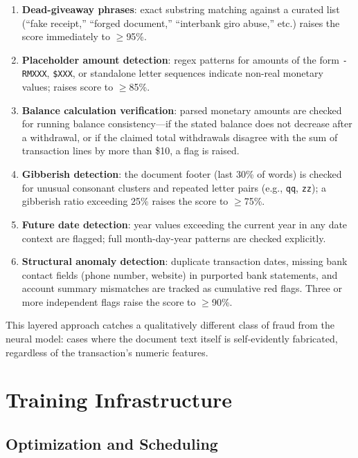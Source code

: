 \documentclass[10pt,conference,letterpaper]{IEEEtran}
\begin{document}
\begin{enumerate}
  \item \textbf{Dead-giveaway phrases}: exact substring matching against a curated list
  (``fake receipt,'' ``forged document,'' ``interbank giro abuse,'' etc.) raises the
  score immediately to $\geq$95\%.
  \item \textbf{Placeholder amount detection}: regex patterns for amounts of the form
  \texttt{-RMXXX}, \texttt{\$XXX}, or standalone letter sequences indicate non-real
  monetary values; raises score to $\geq$85\%.
  \item \textbf{Balance calculation verification}: parsed monetary amounts are checked
  for running balance consistency---if the stated balance does not decrease after a
  withdrawal, or if the claimed total withdrawals disagree with the sum of transaction
  lines by more than \$10, a flag is raised.
  \item \textbf{Gibberish detection}: the document footer (last 30\% of words) is
  checked for unusual consonant clusters and repeated letter pairs (e.g., \texttt{qq},
  \texttt{zz}); a gibberish ratio exceeding 25\% raises the score to $\geq$75\%.
  \item \textbf{Future date detection}: year values exceeding the current year in any
  date context are flagged; full month-day-year patterns are checked explicitly.
  \item \textbf{Structural anomaly detection}: duplicate transaction dates, missing
  bank contact fields (phone number, website) in purported bank statements, and
  account summary mismatches are tracked as cumulative red flags. Three or more
  independent flags raise the score to $\geq$90\%.
\end{enumerate}

This layered approach catches a qualitatively different class of fraud from the neural
model: cases where the document text itself is self-evidently fabricated, regardless of
the transaction's numeric features.

\section{Training Infrastructure}

\subsection{Optimization and Scheduling}
\end{document}
